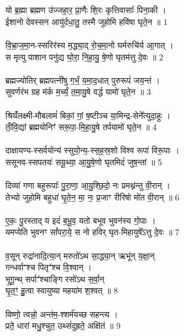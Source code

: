 \section{}
यो ब्र॒ह्मा ब्रह्मण उ॑ज्जहा॒र॒ प्रा॒णैः शि॒रः कृत्तिवासाः᳚ पिना॒की ।\\
ईशानो देवस्सन आयु॑र्दधा॒तु॒ तस्मै जुहोमि हवि॑षा घृते॒न ॥ 1\\
\\
वि॒भ्रा॒ज॒मा॒न-स्सरिर॑स्य म॒द्ध्या॒द् रो॒च॒मा॒नो घर्मरुचि॑र्य आ॒गात् ।\\
स मृत्यु पाशान पनु॑द्य घो॒रा॒ नि॒हा॒यु॒ षे॒णो घृतम॑त्तु दे॒वः ॥ 2\\
\\
ब्रह्मज्योतिर् ब्रह्मपत्नी॑षु ग॒र्भं॒ य॒मा॒द॒धात् पुरुरूपं॑ जय॒न्तं ।\\
सुवर्णरंभ ग्रह म॑र्क म॒र्च्यं॒ त॒मा॒यु॒षे वर्द्ध यामो॑ घृते॒न ॥ 3\\
\\
श्रियंँलक्ष्मी-मौबलामं॑ बिकां॒ गां॒ ष॒ष्टीञ्च या॒मिन्द्र-सेने᳚त्युदा॒हुः ।\\
तांँ॒वि॒द्यां ब्रह्मयोनिꣳ॑ सरू॒पा॒-मि॒हा॒यु॒षे तर्पयामो॑ घृते॒न ॥ 4\\
\\
दाक्षायण्य-स्सर्वयोन्य॑ स्सुयो॒न्य॒-स्स॒ह॒स्र॒शो विश्व रूपा॑ विरू॒पाः ।\\
ससूनव-स्सपतयः॑ सयू॒थ्या॒ आ॒यु॒षे॒णो घृतमिदं॑ जुष॒न्तां ॥ 5\\
\\
दिव्या॑ गणा बहुरूपाः᳚ पु॒रा॒णा॒ आ॒यु॒श्छि॒दो॒ नः प्रमथ्न॑न्तु वी॒रान् ।\\
तेभ्यो जुहोमि बहुधा॑ घृ॒ते॒न॒ मा॒ नः॒ प्र॒जाꣳ रीरिषो मो॑त वी॒रान् ॥ 6\\
\\
ए॒कः॒ पु॒रस्ताद् य इदं॑ ब॒भू॒व॒ यतो बभूव भुवन॑स्य गो॒पाः ।\\
यमप्येति भुवनꣳ सां᳚परा॒ये॒ स नो हविर् घृत-मिहायुषे᳚ऽत्तु दे॒वः ॥ 7\\
\\
व॒सून् रुद्रा॑नादि॒त्या॒न् मरुतो॑ऽथ सा॒द्ध्या॒न् ऋभू॑न् य॒क्षा॒न्\\
गन्धर्वाꣲश्च पितृꣲ॑श्च वि॒श्वान् ।\\
भृ॒गू॒न्थ् सर्पाꣲ॑श्चाङ्गि रसो॑ऽथ स॒र्वा॒न्\\
घृ॒त॒ꣳ॒ हु॒त्वा स्वायुष्या महया॑म श॒श्वत् ॥ 8\\
\\
विष्णो॒ त्वन्नो॒ अन्त॑म॒-श्शर्म॑यच्छ सहन्त्य ।\\
प्रते॒ धारा॑ मधु॒श्चुत॒ उथ्सं॑दुह्रते॒ अक्षि॑तं ॥ 9\\